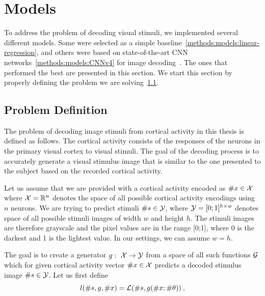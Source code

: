 \section{Models}
\label{methods:models}
To address the problem of decoding visual stimuli, we implemented several different models. Some were selected as a simple baseline~\ref{methods:models:linear-regression}, and others were based on state-of-the-art CNN networks~\ref{methods:models:CNNv4} for image decoding~\citep{zhang2020reconstruction}. The ones that performed the best are presented in this section. We start this section by properly defining the problem we are solving~\ref{methods:models:problem-definition}.


\subsection{Problem Definition}
\label{methods:models:problem-definition}
The problem of decoding image stimuli from cortical activity in this thesis is defined as follows. The cortical activity consists of the responses of the neurons in the primary visual cortex to visual stimuli. The goal of the decoding process is to accurately generate a visual stimulus image that is similar to the one presented to the subject based on the recorded cortical activity.

Let us assume that we are provided with a cortical activity encoded as $\#{x} \in {\cal X}$ where ${\cal X} = \mathbb{R}^{n}$ denotes the space of all possible cortical activity encodings using $n$ neurons.
We are trying to predict stimuli $\#{s} \in {\cal Y}$, where ${\cal Y} = [0;1]^{h \times w}$ denotes space of all possible stimuli images of width $w$ and height $h$. The stimuli images are therefore grayscale and the pixel values are in the range [0;1], where 0 is the darkest and 1 is the lightest value. In our settings, we can assume $w=h$.

The goal is to create a generator $g:\ {\cal X} \rightarrow {\cal Y}$ from a space of all such functions ${\cal G}$ which for given cortical activity vector $\#{x} \in {\cal X}$ predicts a decoded stimulus image $\#{s} \in {\cal Y}$. Let us first define
\begin{equation}
\label{equation:predictor-loss}
l(\#{s}, g, \#{x}) = {\cal L}(\#{s}, g(\#{x} ; \#\theta))\:,
\end{equation}

